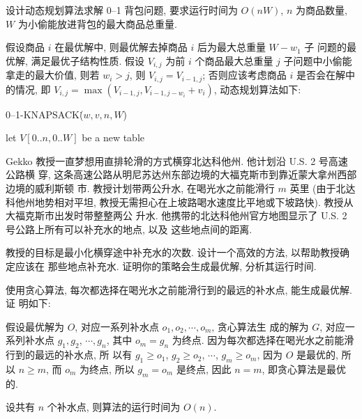 \documentclass[boxes]{homework}
\begin{document}
\begin{problem}
设计动态规划算法求解 0--1 背包问题, 要求运行时间为 $O(nW)$, $n$ 为商品数量,
$W$ 为小偷能放进背包的最大商品总重量.
\end{problem}
\begin{solution}
    假设商品 $i$ 在最优解中, 则最优解去掉商品 $i$ 后为最大总重量 $W - w_{1}$ 子
    问题的最优解, 满足最优子结构性质. 假设 $V_{i, j}$ 为前 $i$ 个商品最大总重量
    $j$ 子问题中小偷能拿走的最大价值, 则若 $w_{i} > j$, 则
    $V_{i, j} = V_{i - 1, j}$; 否则应该考虑商品 $i$ 是否会在解中的情况, 即
    $V_{i, j} = \max \left( V_{i - 1, j}, V_{i - 1, j - w_{i}} + v_{i}\right)$,
    动态规划算法如下:
    \begin{algo}
        \caption{0--1-KNAPSACK\.($w, v, n, W$)}
        let $V[0..n, 0..W]$ be a new table\;
        \;
    \end{algo}
\end{solution}

\begin{problem}
Gekko 教授一直梦想用直排轮滑的方式横穿北达科他州. 他计划沿 U.S. 2 号高速公路横
穿, 这条高速公路从明尼苏达州东部边境的大福克斯市到靠近蒙大拿州西部边境的威利斯顿
市. 教授计划带两公升水, 在喝光水之前能滑行 $m$ 英里 (由于北达科他州地势相对平坦,
教授无需担心在上坡路喝水速度比平地或下坡路快). 教授从大福克斯市出发时带整整两公
升水. 他携带的北达科他州官方地图显示了 U.S. 2 号公路上所有可以补充水的地点, 以及
这些地点间的距离.

教授的目标是最小化横穿途中补充水的次数. 设计一个高效的方法, 以帮助教授确定应该在
那些地点补充水. 证明你的策略会生成最优解, 分析其运行时间.
\end{problem}
\begin{solution}
    使用贪心算法, 每次都选择在喝光水之前能滑行到的最远的补水点, 能生成最优解. 证
    明如下:

    假设最优解为 $O$, 对应一系列补水点 $o_{1}, o_{2}, \cdots, o_{m}$, 贪心算法生
    成的解为 $G$, 对应一系列补水点 $g_{1}, g_{2}$, $\cdots, g_{n}$, 其中
    $o_{m} = g_{n}$ 为终点. 因为每次都选择在喝光水之前能滑行到的最远的补水点, 所
    以有 $g_{1} \geqslant o_{1}$, $g_{2} \geqslant o_{2}$, $\cdots$,
    $g_{m} \geqslant o_{m}$, 因为 $O$ 是最优的, 所以 $n \geqslant m$, 而 $o_{m}$
    为终点, 所以 $g_{m} = o_{m}$ 是终点, 因此 $n = m$, 即贪心算法是最优的.

    设共有 $n$ 个补水点, 则算法的运行时间为 $O(n)$.
\end{solution}
\end{document}
